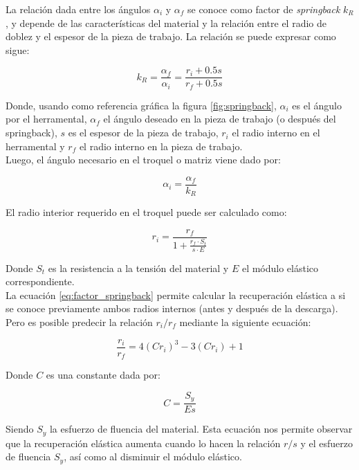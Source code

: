 La relación dada entre los ángulos $\alpha_i$ y $\alpha_f$ se conoce como factor de \textit{springback} $k_R$, 
y depende de las características del material y la relación entre el radio de doblez y el espesor de la 
pieza de trabajo. La relación se puede expresar como sigue: ~\cite{schuler1998}

\begin{equation}\label{eq:factor_springback}
k_R = \frac{\alpha_f}{\alpha_i} = \frac{r_{i} + 0.5 s}{r_{f} + 0.5 s}
\end{equation}

Donde, usando como referencia gráfica la figura \ref{fig:springback}, $\alpha_i$ es el ángulo por el 
herramental, $\alpha_f$ el ángulo deseado en la pieza de trabajo (o después del springback), 
$s$ es el espesor de la pieza de trabajo, $r_{i}$ el radio interno en el herramental y $r_{f}$ el 
radio interno en la pieza de trabajo.\\

Luego, el ángulo necesario en el troquel o matriz viene dado por:

\begin{equation}
\alpha_i = \frac{\alpha_f}{k_R}
\end{equation}

El radio interior requerido en el troquel puede ser calculado como:

\begin{equation}
r_{i} = \frac{r_{f}}{1+\frac{r_{f} \cdot S_t}{s \cdot E}}
\end{equation}

Donde $S_t$ es la resistencia a la tensión del material y $E$ el módulo elástico correspondiente.\\

La ecuación \ref{eq:factor_springback} permite calcular la recuperación elástica a si se conoce 
previamente ambos radios internos (antes y después de la descarga). Pero es posible 
predecir la relación $r_i/r_f$ mediante la siguiente ecuación: ~\cite{kalpakjian2008}

\begin{equation}
\frac{r_i}{r_f} = 4 \left( C r_i\right)^3 - 3 \left( C r_i \right) + 1
\end{equation}

Donde $C$ es una constante dada por:

\begin{equation}
C = \frac{S_y}{Es}
\end{equation}

Siendo $S_y$ la esfuerzo de fluencia del material. Esta ecuación nos permite observar 
que la recuperación elástica aumenta cuando lo hacen la relación $r/s$ y el 
esfuerzo de fluencia $S_y$, así como al disminuir el módulo elástico.


